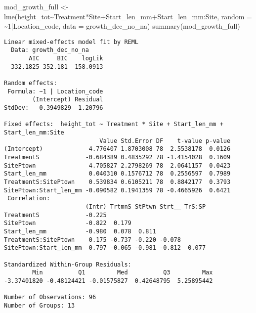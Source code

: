 \documentclass[
  letterpaper,
  DIV=11,
  numbers=noendperiod]{scrartcl}
\newenvironment{Shaded}{\begin{snugshade}}{\end{snugshade}}
\newcommand{\AttributeTok}[1]{\textcolor[rgb]{0.40,0.45,0.13}{#1}}
\newcommand{\DecValTok}[1]{\textcolor[rgb]{0.68,0.00,0.00}{#1}}
\newcommand{\FunctionTok}[1]{\textcolor[rgb]{0.28,0.35,0.67}{#1}}
\newcommand{\NormalTok}[1]{\textcolor[rgb]{0.00,0.23,0.31}{#1}}
\newcommand{\OtherTok}[1]{\textcolor[rgb]{0.00,0.23,0.31}{#1}}
\newcommand{\SpecialCharTok}[1]{\textcolor[rgb]{0.37,0.37,0.37}{#1}}
\begin{document}
\begin{Shaded}
\begin{Highlighting}[]
\NormalTok{mod\_growth\_full }\OtherTok{\textless{}{-}} \FunctionTok{lme}\NormalTok{(height\_tot}\SpecialCharTok{\textasciitilde{}}\NormalTok{Treatment}\SpecialCharTok{*}\NormalTok{Site}\SpecialCharTok{+}\NormalTok{Start\_len\_mm}\SpecialCharTok{+}\NormalTok{Start\_len\_mm}\SpecialCharTok{:}\NormalTok{Site, }
                       \AttributeTok{random =} \SpecialCharTok{\textasciitilde{}}\DecValTok{1}\SpecialCharTok{|}\NormalTok{Location\_code, }\AttributeTok{data =}\NormalTok{ growth\_dec\_no\_na)}
\FunctionTok{summary}\NormalTok{(mod\_growth\_full)}
\end{Highlighting}
\end{Shaded}

\begin{verbatim}
Linear mixed-effects model fit by REML
  Data: growth_dec_no_na 
       AIC     BIC    logLik
  332.1825 352.181 -158.0913

Random effects:
 Formula: ~1 | Location_code
        (Intercept) Residual
StdDev:   0.3949829  1.20796

Fixed effects:  height_tot ~ Treatment * Site + Start_len_mm + Start_len_mm:Site 
                           Value Std.Error DF    t-value p-value
(Intercept)             4.776407 1.8703008 78  2.5538178  0.0126
TreatmentS             -0.684389 0.4835292 78 -1.4154028  0.1609
SitePtown               4.705827 2.2798269 78  2.0641157  0.0423
Start_len_mm            0.040310 0.1576712 78  0.2556597  0.7989
TreatmentS:SitePtown    0.539834 0.6105211 78  0.8842177  0.3793
SitePtown:Start_len_mm -0.090582 0.1941359 78 -0.4665926  0.6421
 Correlation: 
                       (Intr) TrtmnS StPtwn Strt__ TrS:SP
TreatmentS             -0.225                            
SitePtown              -0.822  0.179                     
Start_len_mm           -0.980  0.078  0.811              
TreatmentS:SitePtown    0.175 -0.737 -0.220 -0.078       
SitePtown:Start_len_mm  0.797 -0.065 -0.981 -0.812  0.077

Standardized Within-Group Residuals:
        Min          Q1         Med          Q3         Max 
-3.37401820 -0.48124421 -0.01575827  0.42648795  5.25895442 

Number of Observations: 96
Number of Groups: 13 
\end{verbatim}
\end{document}
